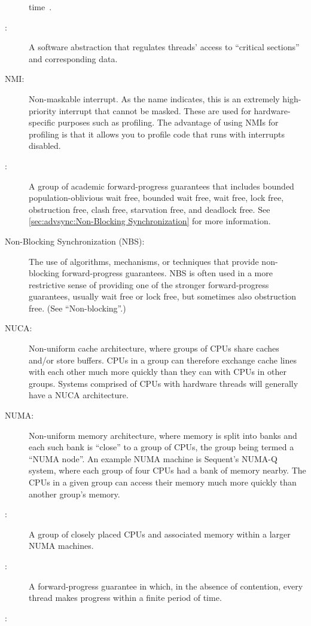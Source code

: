 \begin{description}
	time~\cite{GordonMoore1965MooresLaw}.
\item[\IXG{Mutual-Exclusion Mechanism}:]
	A software abstraction that regulates threads' access to
	``critical sections'' and corresponding data.
\item[NMI:]
	Non-maskable interrupt.
	As the name indicates, this is an extremely high-priority
	interrupt that cannot be masked.
	These are used for hardware-specific purposes such as profiling.
	The advantage of using NMIs for profiling is that it allows you
	to profile code that runs with interrupts disabled.
\item[\IXG{Non-Blocking}:]
	A group of academic forward-progress guarantees that includes
	bounded population-oblivious wait free,
	bounded wait free,
	wait free,
	lock free,
	obstruction free,
	clash free,
	starvation free, and
	deadlock free.
	See \cref{sec:advsync:Non-Blocking Synchronization}
	for more information.
\item[Non-Blocking Synchronization (NBS):]
	The use of algorithms, mechanisms, or techniques that provide
	non-blocking forward-progress guarantees.
	NBS is often used in a more restrictive sense of providing one
	of the stronger forward-progress guarantees, usually wait free or
	lock free, but sometimes also obstruction free.
	(See ``Non-blocking''.)
\item[NUCA:]
	Non-uniform cache architecture, where groups of CPUs share
	caches and/or store buffers.
	CPUs in a group can therefore exchange cache lines with each
	other much more quickly than they can with CPUs in other groups.
	Systems comprised of CPUs with hardware threads will generally
	have a NUCA architecture.
\item[NUMA:]
	Non-uniform memory architecture, where memory is split into
	banks and each such bank is ``close'' to a group of CPUs,
	the group being termed a ``NUMA node''.
	An example NUMA machine is Sequent's NUMA-Q system, where
	each group of four CPUs had a bank of memory nearby.
	The CPUs in a given group can access their memory much
	more quickly than another group's memory.
\item[\IXGaltr{NUMA Node}{NUMA node}:]
	A group of closely placed CPUs and associated memory within
	a larger NUMA machines.
\item[\IXG{Obstruction Free}:]
	A forward-progress guarantee in which, in the absence of
	contention, every thread makes progress within a finite
	period of time.
\item[\IXG{Overhead}:]

\end{description}
